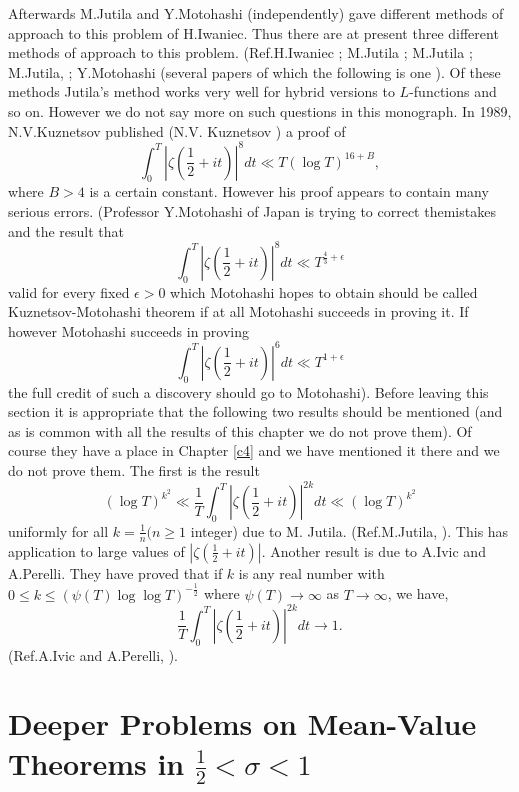 Afterwards M.\@ Jutila and Y.\@ Motohashi (independently) gave
different methods of approach to this problem of H.\@ Iwaniec. Thus
there are at present three different methods of approach to this
problem. (Ref.\@ H.\@ Iwaniec \cite{Iwaniec1}; M.\@ Jutila \cite{Jutila1};
M.\@ Jutila \cite{Jutila3}; M.\@ Jutila, \cite{Jutila4}; Y.\@ Motohashi
(several papers of which the following is one \cite{Motohashi2}). Of these
methods Jutila's method works very well for hybrid versions to
$L$-functions and so on. However we do not say more on such questions
in this monograph. In 1989, N.V.\@ Kuznetsov published (N.V.\@
Kuznetsov \cite{Kuznetsov1}) a proof of
$$
\int^{T}_{0}|\zeta \left(\frac{1}{2}+it \right) |^{8}dt\ll T(\log T)^{16+B},
$$
where $B>4$ is a certain constant. However his proof appears to
contain many serious errors. (Professor Y.\@ Motohashi of Japan is
trying to correct the\pageoriginale mistakes and the result that
$$
\int^{T}_{0}|\zeta \left(\frac{1}{2}+it \right) |^{8}dt\ll T^{\frac{4}{3}+\epsilon} 
$$
valid for every fixed $\epsilon>0$ which Motohashi hopes to obtain
should be called Kuznetsov-Motohashi theorem if at all Motohashi
succeeds in proving it. If however Motohashi succeeds in proving
$$\int^{T}_{0}|\zeta \left(\frac{1}{2}+it \right)|^{6}dt\ll
T^{1+\epsilon}$$
the full credit of such a discovery should go to Motohashi). Before leaving
this section it is appropriate that the following two results should
be mentioned (and as is common with all the results of this chapter we
do not prove them). Of course they have a place in Chapter \ref{c4} and we
have mentioned it there and we do not prove them. The first is the
result
$$
(\log T)^{k^{2}}\ll
\frac{1}{T}\int^{T}_{0}|\zeta \left(\frac{1}{2}+it \right)  |^{2k}dt\ll (\log
T)^{k^{2}}
$$
uniformly for all $k=\frac{1}{n}(n\geq 1$ integer) due to M.\@
Jutila. (Ref.\@ M.\@ Jutila, \cite{Jutila2}). This has application to
large values of $|\zeta(\frac{1}{2}+it)|$. Another result is due to
A.\@ Ivic and A.\@ Perelli. They have proved that if $k$ is any real
number with $0\leq k\leq (\psi(T)\log\log T)^{-\frac{1}{2}}$ where
$\psi(T)\to \infty$ as $T\to \infty$, we have,
$$
\frac{1}{T}\int^{T}_{0}|\zeta \left(\frac{1}{2}+it \right)|^{2k}dt\to 1.
$$
(Ref.\@ A.\@ Ivic and A.\@ Perelli, \cite{Ivic and Perelli1}).

\section{Deeper Problems on Mean-Value Theorems in
  $\frac{1}{2}<\sigma<1$}\label{c6:sec6.4}

